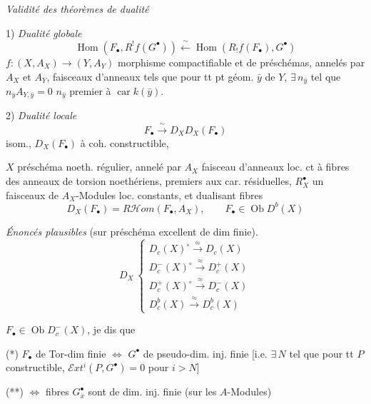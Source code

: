 \documentclass[11pt,a4paper]{article}
\begin{document}
\emph{Validité des théorèmes de dualité}

1) \emph{Dualité globale}
\[
  \operatorname{Hom}(F_{\bullet}, R^{!}f(G^{\bullet}))
  \xleftarrow{\ \sim\ } \operatorname{Hom}(R_{!}f(F_{\bullet}), G^{\bullet})
\]
$f \colon (X, A_{X}) \to (Y, A_{Y})$ morphisme compactifiable et
 de préschémas, annelés par $A_{X}$ et $A_{Y}$,
\struck{\ill{}} faisceaux d'anneaux  tels que pour tt pt
géom. $\bar{y}$ de $Y$, $\exists\, n_{\bar{y}}$ tel que
$n_{\bar{y}} A_{Y,\bar{y}} = 0$   $n_{\bar{y}}$
premier à $\operatorname{car} k(\bar{y})$.

2) \emph{Dualité locale}
\[
  F_{\bullet} \xrightarrow{\ \sim\ } D_{X} D_{X}(F_{\bullet})
\]
isom., $D_{X}(F_{\bullet})$ à coh. constructible,

$X$ préschéma  noeth. régulier, annelé par $A_{X}$ faisceau
d'anneaux loc. ct à fibres  \ill{} des anneaux de torsion
noethériens, premiers aux car. résiduelles, $R^{\bullet}_{X}$ un
 faisceaux de $A_{X}$-Modules loc. constants, et dualisant
 fibres 
\[
  D_{X}(F_{\bullet}) = R\mathcal{H}om(F_{\bullet}, A_{X}),
  \qquad F_{\bullet} \in \operatorname{Ob} D^{b}(X)
\]

\emph{Énoncés plausibles} (sur préschéma excellent de dim finie).
\[
  D_{X} \
  \begin{cases}
    D_{c}(X)^{\circ} \xrightarrow{\ \approx\ } D_{c}(X) \\
    D_{c}^{-}(X)^{\circ} \xrightarrow{\ \approx\ } D_{c}^{+}(X) \\
    D_{c}^{+}(X)^{\circ} \xrightarrow{\ \approx\ } D_{c}^{-}(X) \\
    D_{c}^{b}(X) \xrightarrow{\ \approx\ } D_{c}^{b}(X)
  \end{cases}
\]

$F_{\bullet} \in \operatorname{Ob} D_{c}^{-}(X)$,
 je dis que

(*) $F_{\bullet}$ de Tor-dim finie $\Longleftrightarrow$ $G^{\bullet}$ de
pseudo-dim. inj. finie [i.e. $\exists\, N$ tel que pour tt \struck{$G$} $P$
\struck{$\in \operatorname{Ob} D_{c}$} \add{\uncertain{parfait}} constructible,
$\mathcal{E}xt^{i}(P, G^{\bullet}) = 0$ pour $i > N$]

(**) $\Longleftrightarrow$ fibres \struck{\ill{}} $G^{\bullet}_{\bar{x}}$ sont de
dim. inj. finie (sur les $A$-Modules)
\end{document}
